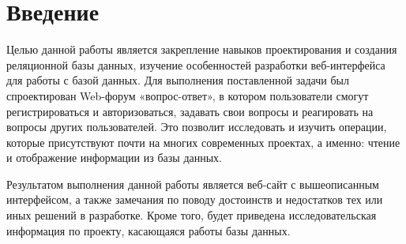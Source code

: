 \chapter*{Введение}

Целью данной работы является закрепление навыков проектирования и создания реляционной  базы  данных, изучение  особенностей  разработки веб-интерфейса для работы с базой данных.
Для выполнения поставленной задачи был спроектирован Web-форум «вопрос-ответ», в котором пользователи смогут регистрироваться и авторизоваться, задавать свои вопросы и реагировать на вопросы других пользователей.
Это позволит исследовать и изучить операции, которые присутствуют почти на многих современных проектах, а именно: чтение и отображение информации из базы данных.

Результатом выполнения данной работы является веб-сайт с вышеописанным интерфейсом, а также замечания по поводу достоинств и недостатков тех или иных решений в разработке.
Кроме того, будет приведена исследовательская информация по проекту, касающаяся работы базы данных.
